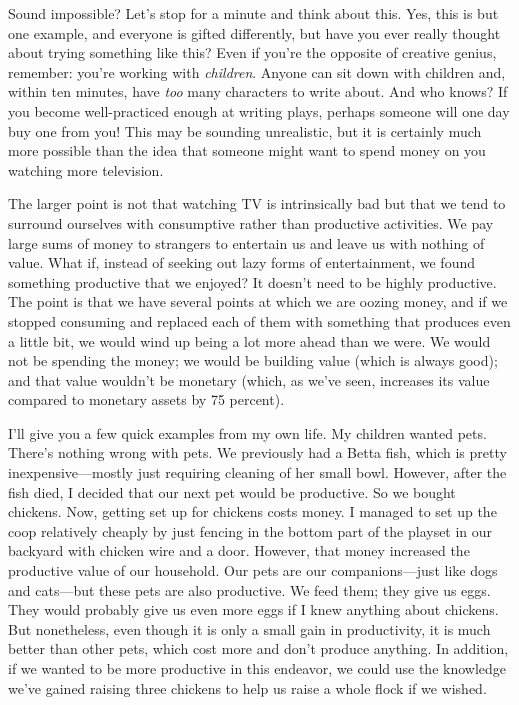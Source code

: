\documentclass[letterpaper]{article}
\begin{document}
{\color{black}
\textcolor[rgb]{0.32941177,0.5529412,0.83137256}{Sound impossible? Let’s
stop for a minute and think about this. Yes, this is but one example,
and everyone is gifted differently, but have you ever really thought
about trying something like this? Even if you’re the opposite of
creative genius, remember: you’re working with
}\textit{\textcolor[rgb]{0.32941177,0.5529412,0.83137256}{children}}\textcolor[rgb]{0.32941177,0.5529412,0.83137256}{.
Anyone can sit down with children and, within ten minutes, have
}\textit{\textcolor[rgb]{0.32941177,0.5529412,0.83137256}{too}}\textcolor[rgb]{0.32941177,0.5529412,0.83137256}{
many characters to write about. }And who knows? If you become
well-practiced enough at writing plays, perhaps someone will one day
buy one from you!  This may be sounding unrealistic, but it is
certainly much more possible than the idea that someone might want to
spend money on you watching more television.}

{\color{black}
The larger point is not that watching TV is intrinsically bad but that
we tend to surround ourselves with consumptive rather than productive
activities. We pay large sums of money to strangers to entertain us and
leave us with nothing of value. What if, instead of seeking out lazy
forms of entertainment, we found something productive that we enjoyed? 
It doesn’t need to be highly productive. The point is that we have
several points at which we are oozing money, and if we stopped
consuming and replaced each of them with something that produces even a
little bit, we would wind up being a lot more ahead than we were. We
would not be spending the money; we would be building value (which is
always good); and that value wouldn’t be monetary (which, as we’ve
seen, increases its value compared to monetary assets by 75 percent).}

{\color{black}
I’ll give you a few quick examples from my own life. My children wanted
pets. There’s nothing wrong with pets. We previously had a Betta fish,
which is pretty inexpensive—mostly just requiring cleaning of her small
bowl. However, after the fish died, I decided that our next pet would
be productive. So we bought chickens. Now, getting set up for chickens
costs money. I managed to set up the coop relatively cheaply by just
fencing in the bottom part of the playset in our backyard with chicken
wire and a door. However, that money increased the productive value of
our household. Our pets are our companions—just like dogs and cats—but
these pets are also productive. We feed them; they give us eggs. They
would probably give us even more eggs if I knew anything about
chickens. But nonetheless, even though it is only a small gain in
productivity, it is much better than other pets, which cost more and
don’t produce anything. In addition, if we wanted to be more productive
in this endeavor, we could use the knowledge we’ve gained raising three
chickens to help us raise a whole flock if we wished.}
\end{document}
